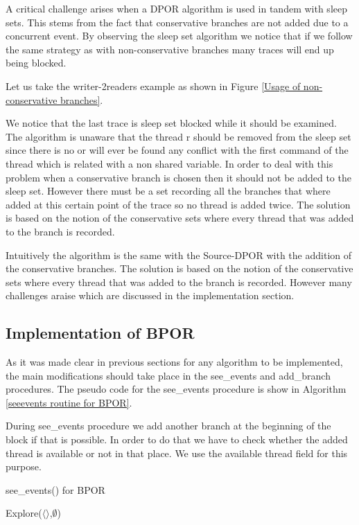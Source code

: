 A critical challenge arises when a DPOR algorithm is used in tandem with sleep sets. This stems from the fact that conservative branches are not added due to a
concurrent event. By observing the sleep set algorithm we notice that if we follow the same strategy as with non-conservative branches many traces will end up being blocked.

Let us take the writer-2readers example as shown in Figure \ref{Usage of non-conservative branches}.


We notice that the last trace is sleep set blocked while it should be examined. The algorithm is unaware that the thread r should be removed from the sleep set since there is no
or will ever be found any conflict with the first command of the thread which is related with a non shared variable. In order to deal with this problem when a conservative
branch is chosen then it should not be added to the sleep set. However there must be a set recording all the branches that where added at this certain point of the trace
so no thread is added twice. The solution is based on the notion of the conservative sets where every thread that was added to the branch is recorded. 

Intuitively the algorithm is the same with the Source-DPOR with the addition of the conservative branches. The solution is based on the notion of the conservative sets where every thread that was added to the branch is recorded.  However many challenges araise which are discussed 
in the implementation section.


\subsection{Implementation of BPOR}
As it was made clear in previous sections for any algorithm to be implemented, the main modifications should take place in the see\_events and add\_branch procedures. 
The pseudo code for the see\_events procedure is show in Algorithm \ref{seeevents routine for BPOR}.

During see\_events procedure we add another branch at the beginning of the block if that is possible. In order to do that we have to check whether the added thread
is available or not in that place. We use the available thread field for this purpose.

\begin{algorithm}[H]
    \caption{see\_events() for BPOR}
    \label{seeevents routine for BPOR}
    Explore($\langle \rangle$,$\emptyset$)\;
\end{algorithm}

